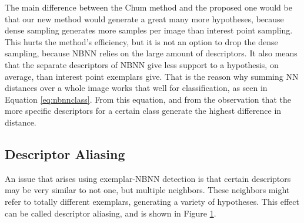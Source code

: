 The main difference between the Chum method and the proposed one would be that our new method would generate a great many more hypotheses, because dense sampling generates more samples per image than interest point sampling. This hurts the method's efficiency, but it is not an option to drop the dense sampling, because NBNN relies on the large amount of descriptors. It also means that the separate descriptors of NBNN give less support to a hypothesis, on average, than interest point exemplars give. That is the reason why summing NN distances over a whole image works that well for classification, as seen in Equation \eqref{eq:nbnnclass}. From this equation, and from the observation that the more specific descriptors for a certain class generate the highest difference in distance.





\subsection{Descriptor Aliasing} %
\label{sec:descriptor_aliasing}

An issue that arises using exemplar-NBNN detection is that certain descriptors may be very similar to not one, but multiple neighbors. These neighbors might refer to totally different exemplars, generating a variety of hypotheses. This effect can be called descriptor aliasing, and is shown in Figure \ref{fig:aliasing}.
\begin{figure}[hbt]
    \label{fig:aliasing}
    \centering
\end{figure}

